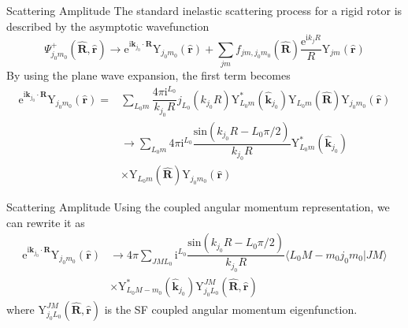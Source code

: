 \documentclass{beamer}
\begin{document}
	\begin{frame}{Scattering Amplitude}
		The standard inelastic scattering process for a rigid rotor is described by the asymptotic wavefunction
		\begin{equation}
			\Psi^+_{j_0m_0}(\hat{\mathbf{R}},\hat{\mathbf{r}})\rightarrow\mathrm{e}^{\mathrm{i}\mathbf{k}_{j_0}\cdot\mathbf{R}}\mathrm{Y}_{j_0m_0}(\hat{\mathbf{r}})+\sum\limits_{jm}f_{jm,j_0m_0}(\hat{\mathbf{R}})\dfrac{\mathrm{e}^{\mathrm{i}k_jR}}{R}\mathrm{Y}_{jm}(\hat{\mathbf{r}})
			\label{210}
		\end{equation}
		By using the plane wave expansion, the first term becomes
		\begin{align}
			\mathrm{e}^{\mathrm{i}\mathbf{k}_{j_0}\cdot\mathbf{R}}\mathrm{Y}_{j_0m_0}(\hat{\mathbf{r}})=&\sum\limits_{L_0m}\dfrac{4\pi\mathrm{i}^{L_0}}{k_{j_0}R}j_{L_0}(k_{j_0}R)\mathrm{Y}^*_{L_0m}(\hat{\mathbf{k}}_{j_0})\mathrm{Y}_{L_0m}(\hat{\mathbf{R}})\mathrm{Y}_{j_0m_0}(\hat{\mathbf{r}})\nonumber\\
			&\rightarrow\sum\limits_{L_0m}4\pi\mathrm{i}^{L_0}\dfrac{\mathrm{sin}(k_{j_0}R-L_0\pi/2)}{k_{j_0}R}\mathrm{Y}^*_{L_0m}(\hat{\mathbf{k}}_{j_0})\nonumber\\
			&\times\mathrm{Y}_{L_0m}(\hat{\mathbf{R}})\mathrm{Y}_{j_0m_0}(\hat{\mathbf{r}})
		\end{align}
	\end{frame}
	\begin{frame}{Scattering Amplitude}
		Using the coupled angular momentum representation, we can rewrite it as
		\begin{align}
			\mathrm{e}^{\mathrm{i}\mathbf{k}_{j_0}\cdot\mathbf{R}}\mathrm{Y}_{j_0m_0}(\hat{\mathbf{r}})
			&\rightarrow4\pi\sum\limits_{JML_0}\mathrm{i}^{L_0}\dfrac{\mathrm{sin}(k_{j_0}R-L_0\pi/2)}{k_{j_0}R}\langle L_0M-m_0j_0m_0|JM\rangle\nonumber\\
			&\times\mathrm{Y}^*_{L_0M-m_0}(\hat{\mathbf{k}}_{j_0})\mathrm{Y}^{JM}_{j_0L_0}(\hat{\mathbf{R}},\hat{\mathbf{r}})
		\end{align}
		where $\mathrm{Y}^{JM}_{j_0L_0}(\hat{\mathbf{R}},\hat{\mathbf{r}})$ is the SF coupled angular momentum eigenfunction.
	\end{frame}
\end{document}
